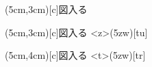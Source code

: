 \documentclass{tarticle}
\begin{document}

\label{layoutcaption}%

\begin{figure}[htbp]
\layoutfloat(5cm,3cm)[c]{\centering 図入る}
\end{figure}

\begin{figure}[htbp]
\layoutfloat(5cm,3cm)[c]{\centering 図入る}
\layoutcaption<z>(5zw)[tu]
\end{figure}

\begin{figure}[htbp]
\layoutfloat(5cm,4cm)[c]{\centering 図入る}
\layoutcaption<t>(5zw)[tr]
\end{figure}
\end{document}
